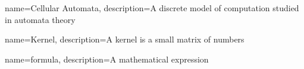 {
    name=Cellular Automata,
    description={A discrete model of computation studied in automata theory}
}

{
    name=Kernel,
    description={A kernel is a small matrix of numbers}
}


{
    name=formula,
    description={A mathematical expression}
}

